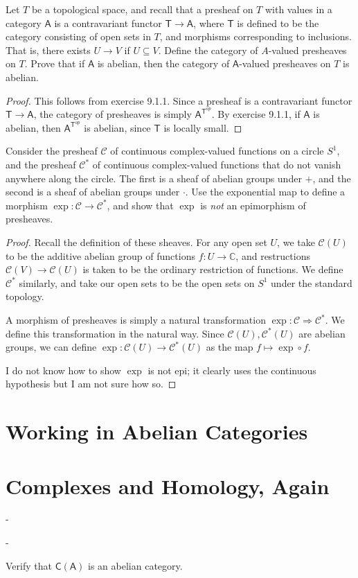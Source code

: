 \documentclass[11pt]{report}
\begin{document}
\begin{exercise}
	Let $T$ be a topological space, and recall that a presheaf on $T$ with values in a category $\mathsf{A} $ is a contravariant functor $\mathsf{T} \to \mathsf{A} $, where $\mathsf{T} $ is defined to be the category consisting of open sets in $T$, and morphisms corresponding to inclusions. That is, there exists $U\to V$ if $U\subseteq V$. Define the category of $A$-valued presheaves on $T$. Prove that if $\mathsf{A} $ is abelian, then the category of $\mathsf{A} $-valued presheaves on $T$ is abelian.
\end{exercise}
\begin{proof}
	This follows from exercise 9.1.1. Since a presheaf is a contravariant functor $\mathsf{T} \to \mathsf{A} $, the category of presheaves is simply $\mathsf{A} ^{\mathsf{T} ^{op} } $. By exercise 9.1.1, if $\mathsf{A} $ is abelian, then $\mathsf{A} ^{\mathsf{T} ^{op} } $ is abelian, since $\mathsf{T} $ is locally small.
\end{proof}
\begin{exercise}
	Consider the presheaf $\mathscr{C} $ of continuous complex-valued functions on a circle $S^1$, and the presheaf $\mathscr{C} ^{*} $ of continuous complex-valued functions that do not vanish anywhere along the circle. The first is a sheaf of abelian groups under $+$, and the second is a sheaf of abelian groups under $\cdot $. Use the exponential map to define a morphism $\exp : \mathscr{C}  \to \mathscr{C} ^*$, and show that $\exp $ is \emph{not} an epimorphism of presheaves.
\end{exercise}
\begin{proof}
	Recall the definition of these sheaves. For any open set $U$, we take $\mathscr{C} (U)$ to be the additive abelian group of functions $f : U \to \mathbb{C} $, and restructions $\mathscr{C} (V)\to \mathscr{C} (U)$ is taken to be the ordinary restriction of functions. We define $\mathscr{C} ^*$ similarly, and take our open sets to be the open sets on $S^1$ under the standard topology.

	A morphism of presheaves is simply a natural transformation $\exp : \mathscr{C}  \Rightarrow \mathscr{C} ^*$. We define this transformation in the natural way. Since $\mathscr{C}(U),\mathscr{C}^*\left( U \right) $ are abelian groups, we can define $\exp : \mathscr{C} (U) \to \mathscr{C} ^*(U)$ as the map $f\mapsto \exp \circ f$.

	I do not know how to show $\exp $ is not epi; it clearly uses the continuous hypothesis but I am not sure how so.
\end{proof}
\section{Working in Abelian Categories}
\section{Complexes and Homology, Again}
\begin{exercise}
	-
\end{exercise}
\begin{exercise}
	-
\end{exercise}
\begin{exercise}
	Verify that $\mathsf{C} (\mathsf{A} )$ is an abelian category.
\end{exercise}
\end{document}
